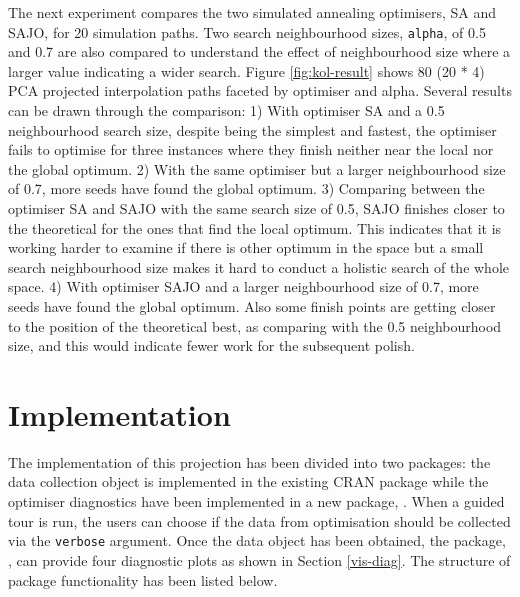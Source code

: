 The next experiment compares the two simulated annealing optimisers, SA
and SAJO, for 20 simulation paths. Two search neighbourhood sizes,
\texttt{alpha}, of 0.5 and 0.7 are also compared to understand the
effect of neighbourhood size where a larger value indicating a wider
search. Figure \ref{fig:kol-result} shows 80 (20 * 4) PCA projected
interpolation paths faceted by optimiser and alpha. Several results can
be drawn through the comparison: 1) With optimiser SA and a 0.5
neighbourhood search size, despite being the simplest and fastest, the
optimiser fails to optimise for three instances where they finish
neither near the local nor the global optimum. 2) With the same
optimiser but a larger neighbourhood size of 0.7, more seeds have found
the global optimum. 3) Comparing between the optimiser SA and SAJO with
the same search size of 0.5, SAJO finishes closer to the theoretical for
the ones that find the local optimum. This indicates that it is working
harder to examine if there is other optimum in the space but a small
search neighbourhood size makes it hard to conduct a holistic search of
the whole space. 4) With optimiser SAJO and a larger neighbourhood size
of 0.7, more seeds have found the global optimum. Also some finish
points are getting closer to the position of the theoretical best, as
comparing with the 0.5 neighbourhood size, and this would indicate fewer
work for the subsequent polish.

\hypertarget{implementation}{%
\section{Implementation}\label{implementation}}

The implementation of this projection has been divided into two
packages: the data collection object is implemented in the existing CRAN
package  \citep{tourr} while the optimiser diagnostics
have been implemented in a new package, . When a guided tour
is run, the users can choose if the data from optimisation should be
collected via the \texttt{verbose} argument. Once the data object has
been obtained, the package, , can provide four diagnostic
plots as shown in Section \ref{vis-diag}. The structure of package
functionality has been listed below.

